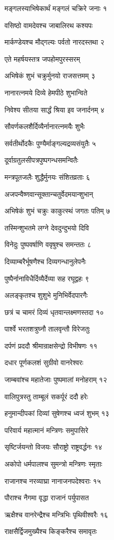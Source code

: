 मङ्गलस्याभिषेकार्थं मङ्गलं चक्रिरे जनाः १

वसिष्ठो वामदेवश्च जाबालिरथ कश्यपः

मार्कण्डेयश्च मौद्गल्यः पर्वतो नारदस्तथा २

एते महर्षयस्तत्र जपहोमपुरस्सरम्

अभिषेकं शुभं चक्रुर्मुनयो राजसत्तमम् ३

नानारत्नमये दिव्ये हेमपीठे शुभान्विते

निवेश्य सीतया सार्द्धं श्रिया इव जनार्दनम् ४

सौवर्णकलशैर्दिव्यैर्नानारत्नमयैः शुभैः

सर्वतीर्थोदकैः पुण्यैर्माङ्गल्यद्रव्यसंयुतैः ५

दूर्वाग्रतुलसीपत्रपुष्पगन्धसमन्वितैः

मन्त्रपूतजलैः शुद्धैर्मुनयः संशितव्रताः ६

अजपन्वैष्णवान्सूक्तान्चतुर्वेदमयान्शुभान्

अभिषेकं शुभं चक्रुः काकुत्स्थं जगतः पतिम् ७

तस्मिन्शुभतमे लग्ने देवदुन्दुभयो दिवि

विनेदुः पुष्पवर्षाणि ववृषुश्च समन्ततः ८

दिव्याम्बरैर्भूषणैश्च दिव्यगन्धानुलेपनैः

पुष्पैर्नानाविधैर्दिव्यैर्देव्या सह रघूद्वहः ९

अलङ्कृतश्च शुशुभे मुनिभिर्वेदपारगैः

छत्रं च चामरं दिव्यं धृतवान्लक्ष्मणस्तदा १०

पार्श्वे भरतशत्रुघ्नौ तालवृन्तौ विरेजतुः

दर्पणं प्रददौ श्रीमान्राक्षसेन्द्रो विभीषणः ११

दधार पूर्णकलशं सुग्रीवो वानरेश्वरः

जाम्बवांश्च महातेजाः पुष्पमालां मनोहराम् १२

वालिपुत्रस्तु ताम्बूलं सकर्पूरं ददौ हरेः

हनुमान्दीपकां दिव्यां सुषेणश्च ध्वजं शुभम् १३

परिवार्य महात्मानं मन्त्रिणः समुपासिरे

सृष्टिर्जयन्तो विजयः सौराष्ट्रो राष्ट्रवर्द्धनः १४

अकोपो धर्मपालश्च सुमन्त्रो मन्त्रिणः स्मृताः

राजानश्च नरव्याघ्रा नानाजनपदेश्वराः १५

पौराश्च नैगमा वृद्धा राजानं पर्युपासत

ऋक्षैश्च वानरेन्द्रैश्च मन्त्रिभिः पृथिवीश्वरैः १६

राक्षसैर्द्विजमुख्यैश्च किङ्करैश्च समावृतः

